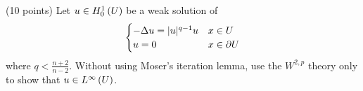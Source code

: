 (10 points)
Let $u \in H_0^{1}\left(U \right)$ be a weak solution of
\begin{align*}
  \begin{cases}
    -\Delta u = |u|^{q - 1} u & x \in U\\
    u = 0 & x \in \partial U
  \end{cases}
\end{align*}
where $q < \frac{n + 2}{n - 2}$.
Without using Moser's iteration lemma, use the $W^{2, p}$ theory only to show that
$u \in L^{\infty}\left(U \right)$.
